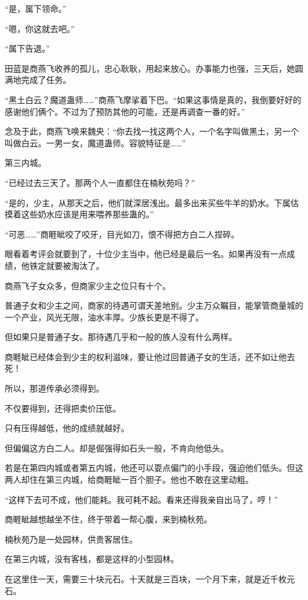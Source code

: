 \begin{this_body}
“是，属下领命。”

“嗯，你这就去吧。”

“属下告退。”

田蓝是商燕飞收养的孤儿，忠心耿耿，用起来放心。办事能力也强，三天后，她圆满地完成了任务。

“黑土白云？魔道蛊师……”商燕飞摩挲着下巴。“如果这事情是真的，我倒要好好的感谢他们俩个。不过为了预防其他的可能，还是再调查一番的好。”

念及于此，商燕飞唤来魏央：“你去找一找这两个人，一个名字叫做黑土，另一个叫做白云。一男一女，魔道蛊师。容貌特征是……”

第三内城。

“已经过去三天了。那两个人一直都住在楠秋苑吗？”

“是的，少主，从那天之后，他们就深居浅出。最多出来买些牛羊的奶水。下属估摸着这些奶水应该是用来喂养那些蛊的。”

“可恶……”商睚眦咬了咬牙，目光如刀，恨不得把方白二人捏碎。

眼看着考评会就要到了，十位少主当中，他已经是最后一名。如果再没有一点成绩，他铁定就要被淘汰了。

商燕飞子女众多，但商家少主之位只有十个。

普通子女和少主之间，商家的待遇可谓天差地别。少主万众瞩目，能掌管商量城的一个产业，风光无限，油水丰厚。少族长更是不得了。

但如果只是普通子女。那待遇几乎和一般的族人没有什么两样。

商睚眦已经体会到少主的权利滋味，要让他过回普通子女的生活，还不如让他去死！

所以，那道传承必须得到。

不仅要得到，还得把卖价压低。

只有压得越低，他的成绩就越好。

但偏偏这方白二人。却是倔强得如石头一般，不肯向他低头。

若是在第四内城或者第五内城，他还可以耍点偏门的小手段，强迫他们低头。但这两人却住在第三内城，给商睚眦一百个胆子。他也不敢在这里动粗。

“这样下去可不成，他们能耗。我可耗不起。看来还得我亲自出马了，哼！”

商睚眦越想越坐不住，终于带着一帮心腹，来到楠秋苑。

楠秋苑乃是一处园林，供贵客居住。

在第三内城，没有客栈，都是这样的小型园林。

在这里住一天，需要三十块元石。十天就是三百块，一个月下来，就是近千枚元石。


\end{this_body}
